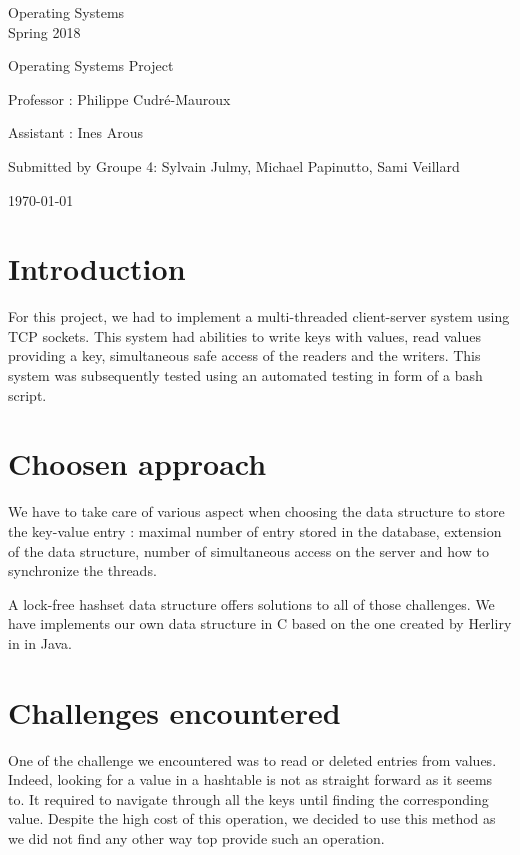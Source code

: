 \documentclass[a4paper,11pt]{report}
\begin{document}
\begin{center}
  \Large{
    Operating Systems\\
    Spring 2018
  }
  
  \noindent\makebox[\linewidth]{\rule{\linewidth}{0.4pt}}
  Operating Systems Project
  \noindent\makebox[\linewidth]{\rule{\linewidth}{0.4pt}}

  \begin{flushleft}
    Professor : Philippe Cudré-Mauroux

    Assistant : Ines Arous
  \end{flushleft}
  
  \noindent\makebox[\linewidth]{\rule{\linewidth}{0.4pt}}

  Submitted by Groupe 4: Sylvain Julmy, Michael Papinutto, Sami Veillard
  
  \noindent\makebox[\linewidth]{\rule{\textwidth}{1pt}}
  \vspace*{0.8cm}
  \today

\end{center}

\newpage

\section*{Introduction}
For this project, we had to implement a multi-threaded client-server system using TCP sockets.
This system had abilities to write keys with values, read values providing a key, simultaneous safe access of the readers and the writers.
This system was subsequently tested using an automated testing in form of a bash script.

\section*{Choosen approach}

We have to take care of various aspect when choosing the data structure to
store the key-value entry : maximal number of entry stored in the database,
extension of the data structure, number of simultaneous access on the server and
how to synchronize the threads.

A lock-free hashset data structure offers solutions to all of those challenges.
We have implements our own data structure in C based on the one created by
Herliry in \cite{Herlihy2006} in Java.

\section*{Challenges encountered}
One of the challenge we encountered was to read or deleted entries from values.
Indeed, looking for a value in a hashtable is not as straight forward as it seems to.
It required to navigate through all the keys until finding the corresponding value.
Despite the high cost of this operation, we decided to use this method as we did not find any other way top provide such an operation.
\end{document}
